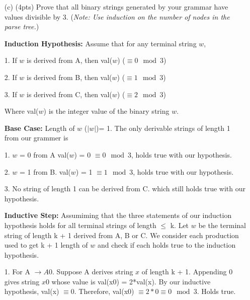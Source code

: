 \documentclass[11pt]{amsart}
\begin{document}
\begin{enumerate}
\item[(c)] (4pts) Prove that all binary strings generated by your grammar have values divisible by 3. ({\it{Note: Use induction on the number of nodes in the parse tree.}})

\vspace{0.25cm}

\textbf{Induction Hypothesis:} Assume that for any terminal string $w$,

\vspace{0.25cm}

1. If $w$ is derived from A, then val($w$) ($\equiv 0 \mod 3$)

2. If $w$ is derived from B, then val($w$) ($\equiv 1 \mod 3$)

3. If $w$ is derived from C, then val($w$) ($\equiv 2 \mod 3$)

\vspace{0.25cm}

Where val($w$) is the integer value of the binary string $w$.

\vspace{0.25cm}

\textbf{Base Case:} Length of $w$ ($|w|$)= 1. The only derivable strings of length 1 from our grammer is

\vspace{0.25cm}

1. $w$ = 0 from A val($w$) = 0 $\equiv 0 \mod 3$, holds true with our hypothesis.

2. $w$ = 1 from B. val($w$) = 1 $\equiv 1 \mod 3$, holds true with our hypothesis.

3. No string of length 1 can be derived from C. which still holds true with our hypothesis.

\vspace{0.25cm}

\textbf{Inductive Step:} Assumiming that the three statements of our induction hypothesis holds for all terminal strings of length $\le$ k. Let $w$ be the terminal string of length k + 1 derived from A, B or C. We consider each production used to get k + 1 length of $w$ and check if each holds true to the induction hypothesis.

\vspace{0.25cm}

1. For A $ \rightarrow A0$. Suppose A derives string $x$ of length k + 1. Appending $0$ gives string $x0$ whose value is val(x0) = 2*val(x). By our inductive hypothesis, val(x) $\equiv 0$. Therefore, val(x0) $\equiv 2*0 \equiv 0 \mod 3$. Holds true.


\end{enumerate}
\end{document}
